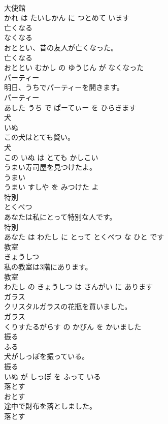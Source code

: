 \documentclass[8pt]{extreport}
\begin{document}
\begin{CJK}{UTF8}{min}
\\	大使館 
\\	かれ は たいしかん に つとめて います			
\\	亡くなる	
\\	なくなる			
\\	おととい、昔の友人が亡くなった。	
\\	亡くなる 
\\	おととい むかし の ゆうじん が なくなった			
\\	パーティー	
\\	明日、うちでパーティーを開きます。	
\\	パーティー 
\\	あした うち で ぱーてぃー を ひらきます			
\\	犬	
\\	いぬ			
\\	この犬はとても賢い。	
\\	犬 
\\	この いぬ は とても かしこい			
\\	うまい寿司屋を見つけたよ。	
\\	うまい 
\\	うまい すしや を みつけた よ			
\\	特別	
\\	とくべつ			
\\	あなたは私にとって特別な人です。
\\	特別 
\\	あなた は わたし に とって とくべつ な ひと です			
\\	教室	
\\	きょうしつ			
\\	私の教室は3階にあります。	
\\	教室 
\\	わたし の きょうしつ は さんがい に あります			
\\	ガラス	
\\	クリスタルガラスの花瓶を買いました。	
\\	ガラス 
\\	くりすたるがらす の かびん を かいました			
\\	振る	
\\	ふる			
\\	犬がしっぽを振っている。	
\\	振る 
\\	いぬ が しっぽ を ふって いる			
\\	落とす	
\\	おとす			
\\	途中で財布を落としました。	
\\	落とす 

\end{CJK}
\end{document}

